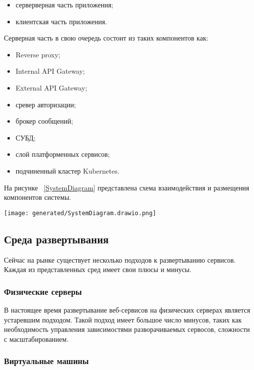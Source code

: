 \begin{itemize}
  \item[---]серверверная часть приложения;
  \item[---]клиентская часть приложения.
\end{itemize}

Серверная часть в свою очередь состоит из таких компонентов как:

\begin{itemize}
  \item[---] Reverse proxy\cite{sommerlad2003reverse};
  \item[---] Internal API Gateway;
  \item[---] External API Gateway;
  \item[---] сревер авторизации;
  \item[---] брокер сообщений;
  \item[---] СУБД;
  \item[---] слой платформенных сервисов;
  \item[---] подчиненный кластер Kubernetes.
\end{itemize}

На рисунке ~\ref{SystemDiagram} представлена схема взаимодействия и размещения компонентов системы.

\begin{figure*}[!t]
  \centering
  \texttt{[image: generated/SystemDiagram.drawio.png]}
  \caption{Компоненты плфтормы}
  \label{SystemDiagram}
\end{figure*}

\subsection{Среда развертывания}

Сейчас на рынке существует несколько подходов к развертыванию сервисов. Каждая из представленных сред имеет свои плюсы и минусы.

\subsubsection{Физические серверы}

В настоящее время развертывание веб-сервисов на физических серверах является устаревшим подходом. Такой подход имеет большое число минусов, таких как необходимость управления зависимостями разворачиваемых сервосов, сложности с масштабированием.

\subsubsection{Виртуальные машины}

